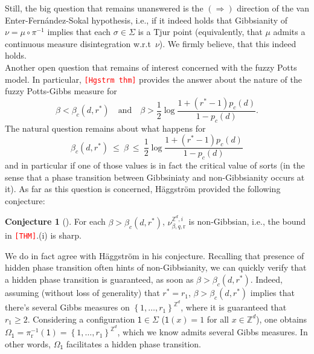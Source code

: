 \documentclass[12pt]{article}
\renewcommand{\r}{\mathrm{r}}
\newcommand{\Z}{\mathbb{Z}}
\newcommand{\set}[1]{\left\{#1\right\}}
\newcommand{\1}{\mathbbm{1}}
\newcommand{\5}{\vspace{0.5cm}}
\theoremstyle{definition}
\newtheorem{conj}[thm]{Conjecture}
\begin{document}
Still, the big question that remains unanswered is the $(\Rightarrow)$ direction of the van Enter-Fern\'andez-Sokal hypothesis, i.e., if it indeed holds that Gibbsianity of $\nu=\mu\circ\pi^{-1}$ implies that each $\sigma\in\Sigma$ is a Tjur point (equivalently, that $\mu$ admits a continuous measure disintegration w.r.t~$\nu$). We firmly believe, that this indeed holds. \\

Another open question that remains of interest concerned with the fuzzy Potts model. In particular, \textcolor{red}{\texttt{[Hgstrm thm]}} provides the answer about the nature of the fuzzy Potts-Gibbs measure for
$$\beta < \beta_c(d,r^*) \quad \text{and} \quad \beta>\frac{1}{2}\log\frac{1+(r^*-1)p_c(d)}{1-p_c(d)}.$$
The natural question remains about what happens for
$$\beta_c(d,r^*) ~\leq~ \beta ~\leq~ \frac{1}{2}\log\frac{1+(r^*-1)p_c(d)}{1-p_c(d)}$$
and in particular if one of those values is in fact the critical value of sorts (in the sense that a phase transition between Gibbsiniaty and non-Gibbsianity occurs at it). As far as this question is concerned, H\"aggstr\"om provided the following conjecture:
\begin{conj}[\cite{Hag}]
For each $\beta>\beta_c(d,r^*)$, $\nu_{\beta,q,\r}^{\Z^d,i}$ is non-Gibbsian, i.e., the bound in \textcolor{red}{\texttt{[THM]}}.(i) is sharp.
\end{conj}
We do in fact agree with H\"aggstr\"om in his conjecture. Recalling that presence of hidden phase transition often hints of non-Gibbsianity, we can quickly verify that a hidden phase transition is guaranteed, as soon as $\beta>\beta_c(d,r^*)$. Indeed, assuming (without loss of generality) that $r^*=r_1$, $\beta>\beta_c(d,r^*)$ implies that there's several Gibbs measures on $\set{1,\ldots,r_1}^{\Z^d}$, where it is guaranteed that $r_1\geq 2$. Considering a configuration $\mathsf{1}\in\Sigma$ ($\mathsf{1}(x)=1$ for all $x\in\Z^d$), one obtains $\Omega_{\mathsf{1}}=\pi_\r^{-1}(\mathsf{1})=\set{1,\ldots,r_1}^{\Z^d}$, which we know admits several Gibbs measures. In other words, $\Omega_{\mathsf{1}}$ facilitates a hidden phase transition. 

\pagebreak



\end{document}

